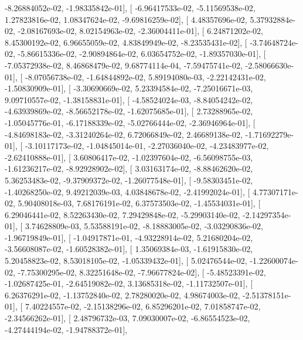 \documentclass{article}
\begin{document}
         -8.26884052e-02,  -1.98335842e-01],
       [ -6.96417533e-02,  -5.11569538e-02,   1.27823816e-02,
          1.08347624e-02,  -9.69816259e-02],
       [  4.48357696e-02,   5.37932884e-02,  -2.08167693e-02,
          8.02154963e-02,  -2.36004411e-01],
       [  6.24871202e-02,   8.45300192e-02,   6.96655059e-02,
          4.83849949e-02,  -8.23535431e-02],
       [ -3.74648724e-02,  -5.86615336e-02,  -2.90894864e-02,
          6.03654752e-02,  -1.89357030e-01],
       [ -7.05372938e-02,   8.46868479e-02,   9.68774114e-04,
         -7.59475741e-02,  -2.58066630e-01],
       [ -8.07056738e-02,  -1.64844892e-02,   5.89194080e-03,
         -2.22142431e-02,  -1.50830909e-01],
       [ -3.30690669e-02,   5.23394584e-02,  -7.25016671e-03,
          9.09710557e-02,  -1.38158831e-01],
       [ -4.58524024e-03,  -8.84054242e-02,  -4.63939869e-02,
         -8.56652178e-02,  -1.62075685e-01],
       [  2.73288965e-02,  -1.05045776e-01,  -6.17188339e-02,
         -5.02766444e-02,  -2.36946964e-01],
       [ -4.84698183e-02,  -3.31240264e-02,   6.72066849e-02,
          2.46689138e-02,  -1.71692279e-01],
       [ -3.10117173e-02,  -1.04845014e-01,  -2.27036040e-02,
         -4.23483977e-02,  -2.62410888e-01],
       [  3.60806417e-02,  -1.02397604e-02,  -6.56098755e-03,
         -1.61236217e-02,  -8.92928902e-02],
       [  3.03163174e-02,  -8.88462620e-02,   5.36253483e-02,
         -9.37909372e-02,  -1.26077548e-01],
       [ -9.58303451e-02,  -1.40268250e-02,   9.49212039e-03,
          4.03848678e-02,  -2.41992024e-01],
       [  4.77307171e-02,   5.90408018e-03,   7.68176191e-02,
          6.37573503e-02,  -1.45534031e-01],
       [  6.29046441e-02,   8.52263430e-02,   7.29429848e-02,
         -5.29903140e-02,  -2.14297354e-01],
       [  3.74628809e-03,   5.53588191e-02,  -8.18883005e-02,
         -3.03290836e-02,  -1.96719849e-01],
       [ -1.04917871e-01,  -4.93228914e-02,   5.21680204e-02,
         -3.56608087e-02,  -1.60528382e-01],
       [  1.35069384e-03,  -1.61915830e-02,   5.20458823e-02,
          8.53018105e-02,  -1.05339432e-01],
       [  5.02476544e-02,  -1.22600074e-02,  -7.75300295e-02,
          8.32251648e-02,  -7.96677824e-02],
       [ -5.48523391e-02,  -1.02687425e-01,  -2.64519082e-02,
          3.13685318e-02,  -1.11732507e-01],
       [  6.26376291e-02,  -1.13752840e-02,   2.78280020e-02,
          4.98674003e-02,  -2.51378151e-01],
       [  7.40224557e-02,  -2.15138296e-02,   6.85296201e-02,
          7.01858747e-02,  -2.34566262e-01],
       [  2.48796732e-03,   7.09030007e-02,  -6.86554523e-02,
         -4.27444194e-02,  -1.94788372e-01],
\end{document}
